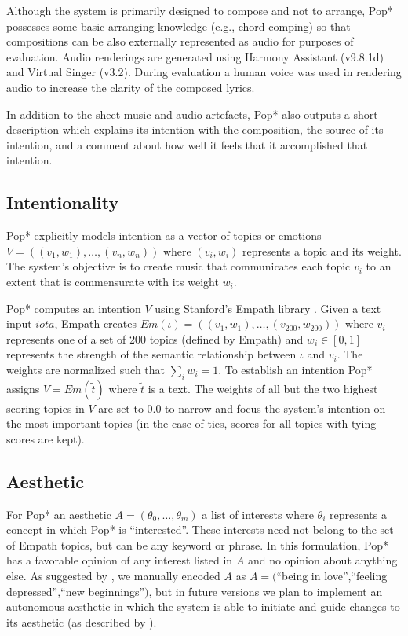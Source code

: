 \documentclass[phd,electronic,oneside,twosidetoc,letterpaper,chaptercenter,parttop,lof,lot]{byumsphd}
\begin{document}
Although the system is primarily designed to compose and not to arrange, Pop* possesses some basic arranging knowledge (e.g., chord comping) so that compositions can be also externally represented as audio for purposes of evaluation. Audio renderings are generated using Harmony Assistant (v9.8.1d) and Virtual Singer (v3.2). During evaluation a human voice was used in rendering audio to increase the clarity of the composed lyrics. 

In addition to the sheet music and audio artefacts, Pop* also outputs a short description which explains its intention with the composition, the source of its intention, and a comment about how well it feels that it accomplished that intention.

\subsection{Intentionality}

Pop* explicitly models intention as a vector of topics or emotions $V=((v_1,w_1),\dots,(v_n,w_n))$ where $(v_i,w_i)$ represents a topic and its weight. The system's objective is to create music that communicates each topic $v_i$ to an extent that is commensurate with its weight $w_i$. 

Pop* computes an intention $V$ using Stanford's Empath library \citep{Fast2016}. Given a text input $iota$, Empath creates $Em(\iota)=((v_1,w_1),\dots,(v_{200},w_{200}))$ where $v_i$ represents one of a set of 200 topics (defined by Empath) and $w_i\in[0,1]$ represents the strength of the semantic relationship between $\iota$ and $v_i$. The weights are normalized such that $\sum_i w_i = 1$. To establish an intention Pop* assigns $V=Em(\tilde{t})$ where $\tilde{t}$ is a text. The weights of all but the two highest scoring topics in $V$ are set to 0.0 to narrow and focus the system's intention on the most important topics (in the case of ties, scores for all topics with tying scores are kept).

\subsection{Aesthetic}

For Pop* an aesthetic $A = (\theta_0,\dots,\theta_m)$ a list of interests where $\theta_i$ represents a concept in which Pop* is ``interested''. These interests need not belong to the set of Empath topics, but can be any keyword or phrase. In this formulation, Pop* has a favorable opinion of any interest listed in $A$ and no opinion about anything else. As suggested by \citeauthor{Ventura2017HowSystem} \cite{Ventura2017HowSystem}, we manually encoded $A$ as $A=($``being in love'',``feeling depressed'',``new beginnings''$)$, but in future versions we plan to implement an autonomous aesthetic in which the system is able to initiate and guide changes to its aesthetic (as described by \citeauthor{Jennings2010DevelopingIntelligence} \cite{Jennings2010DevelopingIntelligence}).
\end{document}
